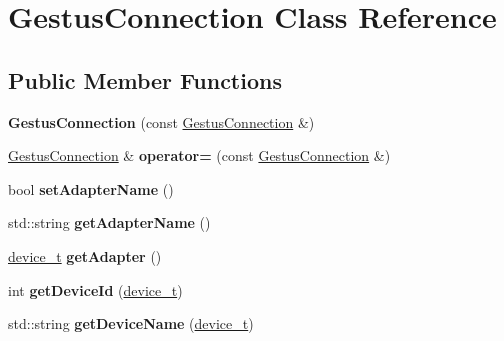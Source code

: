 \hypertarget{classGestusConnection}{}\section{Gestus\+Connection Class Reference}
\label{classGestusConnection}
\subsection*{Public Member Functions}
\begin{DoxyCompactItemize}
\item 
\mbox{\label{classGestusConnection_a1dd64b164bff6ee4d8a49406bc9582b5}} 
{\bfseries Gestus\+Connection} (const \mbox{\hyperlink{classGestusConnection}{Gestus\+Connection}} \&)
\item 
\mbox{\label{classGestusConnection_a6a83fb5fa1ca84e37206c223fe382925}} 
\mbox{\hyperlink{classGestusConnection}{Gestus\+Connection}} \& {\bfseries operator=} (const \mbox{\hyperlink{classGestusConnection}{Gestus\+Connection}} \&)
\item 
\mbox{\label{classGestusConnection_acc086565d3a371b5b3aa1536df336606}} 
bool {\bfseries set\+Adapter\+Name} ()
\item 
\mbox{\label{classGestusConnection_a62623bbcaed138c5c26d9f2509a02dbe}} 
std\+::string {\bfseries get\+Adapter\+Name} ()
\item 
\mbox{\label{classGestusConnection_a2d94def208a11c30ecdd8cd5464730d6}} 
\mbox{\hyperlink{structdevice__t}{device\+\_\+t}} {\bfseries get\+Adapter} ()
\item 
\mbox{\label{classGestusConnection_a22050dece0a420bdacb4c7d59c87954d}} 
int {\bfseries get\+Device\+Id} (\mbox{\hyperlink{structdevice__t}{device\+\_\+t}})
\item 
\mbox{\label{classGestusConnection_aafaade299ab1579a328270adf9f395e7}} 
std\+::string {\bfseries get\+Device\+Name} (\mbox{\hyperlink{structdevice__t}{device\+\_\+t}})
\item 
\mbox{\label{classGestusConnection_ad453799d5224e34f41859b7d6265d9ef}} 

\end{DoxyCompactItemize}
